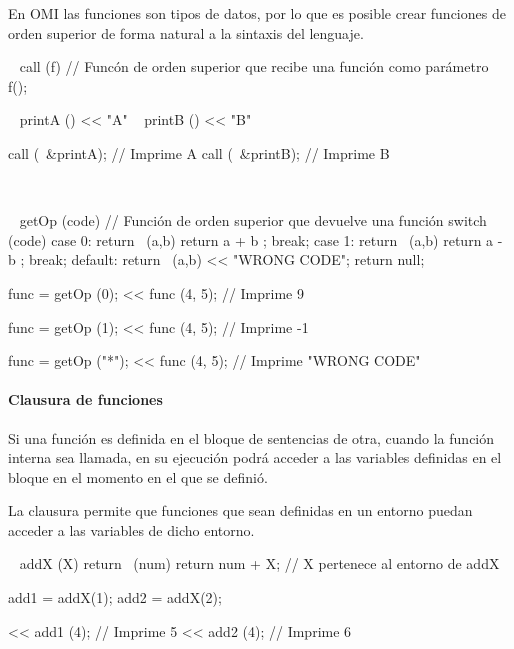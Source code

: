 En OMI las funciones son tipos de datos, por lo que es posible crear funciones de orden superior de
forma natural a la sintaxis del lenguaje. \\

\begin{myverbatim}
   ~ call (f) {  // Funcón de orden superior que recibe una función como parámetro
      f();
   }
   
   ~ printA () { << "A" }
   ~ printB () { << "B" }
   
   call (~&printA); // Imprime A
   call (~&printB); // Imprime B
   
\end{myverbatim}

\hfill \\

\begin{myverbatim}
   ~ getOp (code) {  // Función de orden superior que devuelve una función
      switch (code) {
         case 0:  return ~(a,b) { return a + b }; break;
         case 1: return ~(a,b) { return a - b }; break;
         default: return ~(a,b) { << "WRONG CODE"; return null; }
      }
   }
   
   func = getOp (0);
   << func (4, 5); // Imprime 9
   
   func = getOp (1);
   << func (4, 5); // Imprime -1
   
   func = getOp ("*");
   << func (4, 5); // Imprime "WRONG CODE"
   
\end{myverbatim}

\paragraph{Clausura de funciones}
Si una función es definida en el bloque de sentencias de otra, cuando la función interna sea llamada, en su ejecución podrá 
acceder a las variables definidas en el bloque en el momento en el que se definió.

La clausura permite que funciones que sean definidas en un entorno puedan acceder a las variables de dicho entorno. \\

\begin{myverbatim}
   ~ addX (X) { 
      return ~(num) {
         return num + X; // X pertenece al entorno de addX
      }
   }
   
   add1 = addX(1);
   add2 = addX(2);
   
   << add1 (4); // Imprime 5
   << add2 (4); // Imprime 6
\end{myverbatim}


